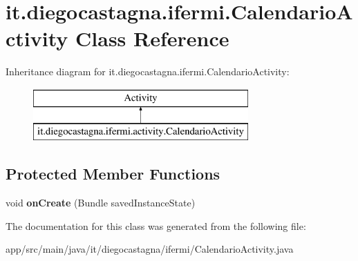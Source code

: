 \hypertarget{classit_1_1diegocastagna_1_1ifermi_1_1_calendario_activity}{}\section{it.\+diegocastagna.\+ifermi.\+Calendario\+Activity Class Reference}
\label{classit_1_1diegocastagna_1_1ifermi_1_1_calendario_activity}
Inheritance diagram for it.\+diegocastagna.\+ifermi.\+Calendario\+Activity\+:\begin{figure}[H]
\begin{center}
\leavevmode
\includegraphics[height=2.000000cm]{classit_1_1diegocastagna_1_1ifermi_1_1_calendario_activity}
\end{center}
\end{figure}
\subsection*{Protected Member Functions}
\begin{DoxyCompactItemize}
\item 
\mbox{\label{classit_1_1diegocastagna_1_1ifermi_1_1_calendario_activity_a7fd47505495dd26632a962eaa7af0a70}} 
void {\bfseries on\+Create} (Bundle saved\+Instance\+State)
\end{DoxyCompactItemize}


The documentation for this class was generated from the following file\+:\begin{DoxyCompactItemize}
\item 
app/src/main/java/it/diegocastagna/ifermi/Calendario\+Activity.\+java\end{DoxyCompactItemize}
